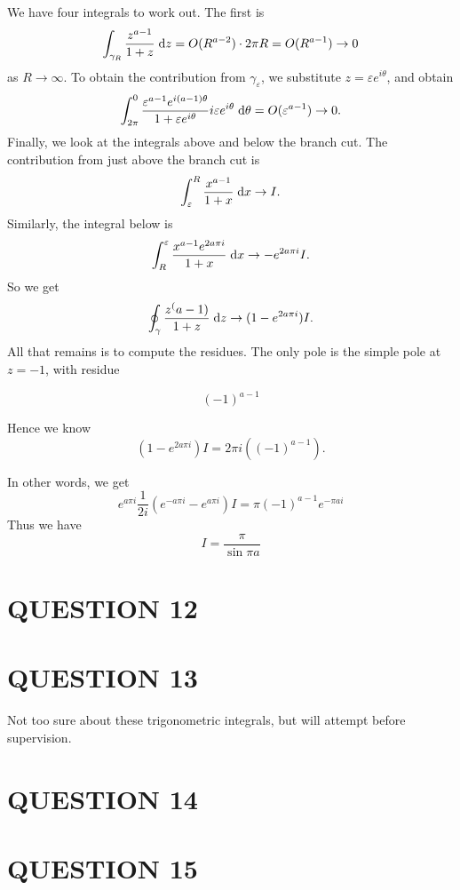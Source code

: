 \documentclass[a4paper]{article}
\begin{document}
We have four integrals to work out. The first is
\[
\int_{\gamma_R} \frac{z^{a-1}}{1 +z} \;\mathrm{d} z= O(R^{a - 2}) \cdot 2\pi R = O(R^{a - 1}) \to 0
\]
as $R \to \infty$. To obtain the contribution from $\gamma_\varepsilon$, we substitute $z = \varepsilon e^{i\theta}$, and obtain
\[
\int_{2\pi}^0 \frac{\varepsilon^{a-1} e^{i(a-1)\theta}}{1 + \varepsilon e^{i\theta}} i \varepsilon e^{i\theta}\;\mathrm{d} \theta = O(\varepsilon^{a - 1}) \to 0.
\]
Finally, we look at the integrals above and below the branch cut. The contribution from just above the branch cut is
\[
\int_\varepsilon^R \frac{x^{a-1}}{1 +x}\;\mathrm{d} x \to I.
\]
Similarly, the integral below is
\[
\int_R^\varepsilon \frac{x^{a-1}e^{2 a \pi i}}{1 +x}\;\mathrm{d} x \to -e^{2a  \pi i}I.
\]
So we get
\[
\oint_\gamma \frac{z^(a-1)}{1 + z}\;\mathrm{d} z \to (1 - e^{2a \pi i})I.
\]
All that remains is to compute the residues. The only pole is the simple pole at $z = -1$, with residue 


\[ (-1)^{a-1} \]

Hence we know
\[
(1 - e^{2a \pi i})I = 2\pi i\left( (-1)^{a-1} \right).
\]


In other words, we get
\[
e^{a \pi i} \frac{1}{2i} (e^{-a \pi i} - e^{a \pi i})I =  \pi (-1)^{a-1} e^{- \pi a i}
\]
Thus we have
\[
I = \frac{\pi}{\sin \pi a}
\]



\section{QUESTION 12}


\section{QUESTION 13}

Not too sure about these trigonometric integrals, but will attempt before supervision.


\section{QUESTION 14}


\section{QUESTION 15}
\end{document}
